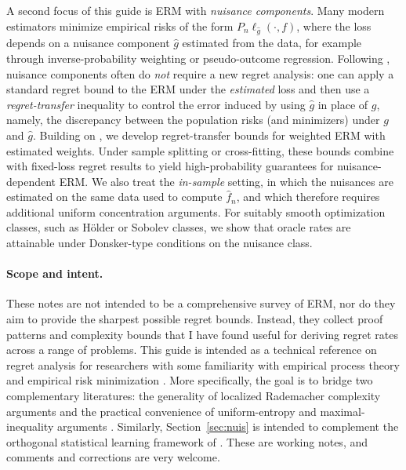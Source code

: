 \documentclass[11pt]{article}
\theoremstyle{plain}
\theoremstyle{definition} %
\begin{document}
A second focus of this guide is ERM with \emph{nuisance components}. Many modern estimators minimize empirical risks of the form \(P_n \ell_{\hat g}(\cdot,f)\), where the loss depends on a nuisance component \(\hat g\) estimated from the data, for example through inverse-probability weighting or pseudo-outcome regression. Following \citet{foster2023orthogonal},
nuisance components often do \emph{not} require a new regret analysis: one can
apply a standard regret bound to the ERM under the \emph{estimated} loss and
then use a \emph{regret-transfer} inequality to control the error induced by
using \(\hat g\) in place of \(g\), namely, the discrepancy between the population
risks (and minimizers) under \(g\) and \(\hat g\). Building on
\citet{foster2023orthogonal}, we develop regret-transfer bounds for weighted ERM
with estimated weights. Under sample splitting or cross-fitting, these bounds
combine with fixed-loss regret results to yield high-probability guarantees for
nuisance-dependent ERM. We also treat the \emph{in-sample} setting, in which the
nuisances are estimated on the same data used to compute \(\hat f_n\), and which
therefore requires additional uniform concentration arguments. For suitably smooth
optimization classes, such as H\"older or Sobolev classes, we show that oracle
rates are attainable under Donsker-type conditions on the nuisance class.



 


\paragraph{Scope and intent.}
These notes are not intended to be a comprehensive survey of ERM, nor do they aim to provide the sharpest possible regret bounds. Instead, they collect proof patterns and complexity bounds that I have found useful for deriving regret rates across a range of problems. This guide is intended as a technical reference on regret analysis for researchers with some familiarity with empirical process theory \citep{van1996weak,sen2018gentle} and empirical risk minimization \citep{wainwright2019high}. More specifically, the goal is to bridge two complementary literatures: the generality of localized Rademacher complexity arguments
\citep{bartlett2002rademacher,bousquet2003introduction,bartlett2005local,wainwright2019high}
and the practical convenience of uniform-entropy and maximal-inequality arguments
\citep{van1996weak,van2011local}. Similarly, Section~\ref{sec:nuis} is intended to complement the orthogonal statistical learning framework of \citet{foster2023orthogonal}. These are working notes, and comments and corrections are very welcome.
\end{document}
